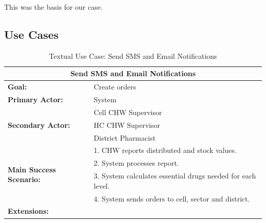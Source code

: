 This was the basis for our case.

\subsection{Use Cases}

\begin{table}
	\centering
	\begin{tabular}{|p{5cm}|p{7cm}|}
		\hline
		\multicolumn{2}{|c|}{\textbf{Send SMS and Email Notifications}}\\
		\hline
		\textbf{Goal:} & Create orders\\
		\hline
		\textbf{Primary Actor:} & System\\
		\hline
		\multirow{3}{*}{\textbf{Secondary Actor:}}	& Cell CHW Supervisor \\
																								& HC CHW Supervisor \\ 
																								& District Pharmacist \\
		\hline
		\multirow{4}{*}{\textbf{Main Success Scenario:}}	& 1. CHW reports distributed and stock values. \\
																											& 2. System processes report. \\
																											& 3. System calculates essential drugs needed for each level. \\
																											& 4. System sends orders to cell, sector and district. \\
		\hline
		\textbf{Extensions:} & \\
		\hline
	\end{tabular}
	\caption{Textual Use Case: Send SMS and Email Notifications}
	\label{tab:notifications}
\end{table}


